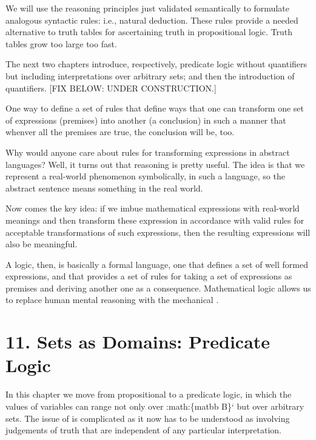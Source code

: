 \documentclass[letterpaper,10pt,english]{sphinxmanual}
\begin{document}
We will use the reasoning principles just validated semantically to
formulate analogous syntactic rules: i.e., natural deduction. These
rules provide a needed alternative to truth tables for ascertaining
truth in propositional logic. Truth tables grow too large too fast.

The next two chapters introduce, respectively, predicate logic without
quantifiers but including interpretations over arbitrary sets; and then
the introduction of quantifiers.
{[}FIX BELOW: UNDER CONSTRUCTION.{]}

One way to define a set of  rules that define ways that one
can transform one set of expressions (premises) into another (a
conclusion) in such a manner that whenver all the premises are true,
the conclusion will be, too.

Why would anyone care about rules for transforming expressions in
abstract languages? Well, it turns out that  reasoning is
pretty useful. The idea is that we represent a real-world phenomenon
symbolically, in such a language, so the abstract sentence means
something in the real world.

Now comes the key idea: if we imbue mathematical expressions with
real-world meanings and then transform these expression in accordance
with valid rules for acceptable transformations of such expressions,
then the resulting expressions will also be meaningful.

A logic, then, is basically a formal language, one that defines a set
of well formed expressions, and that provides a set of 
rules for taking a set of expressions as premises and deriving another
one as a consequence. Mathematical logic allows us to replace human
mental reasoning with the mechanical .


\chapter{11. Sets as Domains: Predicate Logic}
\label{\detokenize{11-predicate-logic:sets-as-domains-predicate-logic}}\label{\detokenize{11-predicate-logic::doc}}
In this chapter we move from propositional to a predicate logic, in
which the values of variables can range not only over :math:\{matbb
B\}{}` but over arbitrary sets. The issue of  is complicated as
it now has to be understood as involving judgements of truth that are
independent of any particular interpretation.
\end{document}
